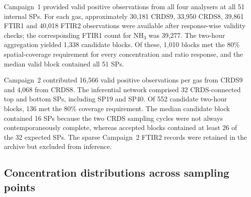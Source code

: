 \documentclass[12pt,a4paper]{article}
\begin{document}
Campaign~1 provided valid positive observations from all four analysers at all 51 internal SPs. For each gas, approximately 30,181 CRDS9, 33,950 CRDS8, 39,861 FTIR1 and 40,018 FTIR2 observations were available after response-wise validity checks; the corresponding FTIR1 count for \(\mathrm{NH_3}\) was 39,277. The two-hour aggregation yielded 1,338 candidate blocks. Of these, 1,010 blocks met the 80\% spatial-coverage requirement for every concentration and ratio response, and the median valid block contained all 51 SPs.

Campaign~2 contributed 16,566 valid positive observations per gas from CRDS9 and 4,068 from CRDS8. The inferential network comprised 32 CRDS-connected top and bottom SPs, including SP19 and SP40. Of 552 candidate two-hour blocks, 136 met the 80\% coverage requirement. The median candidate block contained 16 SPs because the two CRDS sampling cycles were not always contemporaneously complete, whereas accepted blocks contained at least 26 of the 32 expected SPs. The sparse Campaign~2 FTIR2 records were retained in the archive but excluded from inference.

\begin{table}[htbp]
\centering
\caption{Measurement coverage and two-hour blocks used for network-level analyses. Valid positive observations are reported per gas; the \(\mathrm{NH_3}\) count for FTIR1 in Campaign~1 was 39,277. A valid network block contained at least 80\% of the maximum eligible SP count for the campaign.}
\label{tab:coverage}
\small
{}
\end{table}
\fi

\subsection{Concentration distributions across sampling points}
\end{document}
